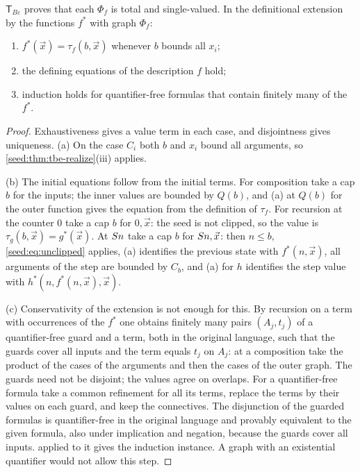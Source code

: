 \begin{lemma}[Graphs]\label{seed:lem:tbe-graph}
$\mathsf{T}_{B\varepsilon}$ proves that each $\Phi_f$ is total and
single-valued. In the definitional extension by the functions $f^*$ with
graph $\Phi_f$:
\begin{enumerate}[label=(\alph*),nosep]
\item $f^*(\vec x)=\tau_f(b,\vec x)$ whenever $b$ bounds all $x_i$;
\item the defining equations of the description $f$ hold;
\item induction holds for quantifier-free formulas that contain finitely
many of the $f^*$.
\end{enumerate}
\end{lemma}

\begin{proof}
Exhaustiveness gives a value term in each case, and disjointness gives
uniqueness. (a) On the case $C_i$ both $b$ and $x_i$ bound all arguments, so
\cref{seed:thm:tbe-realize}(iii) applies.

(b) The initial equations follow from the initial terms. For composition
take a cap $b$ for the inputs; the inner values are bounded by $Q(b)$, and
(a) at $Q(b)$ for the outer function gives the equation from the definition
of $\tau_f$. For recursion at the counter $0$ take a cap $b$ for $0,\vec x$:
the seed is not clipped, so the value is
$\tau_g(b,\vec x)=g^*(\vec x)$. At $S n$ take a cap $b$ for
$S n,\vec x$: then $n\leq b$, \eqref{seed:eq:unclipped} applies, (a)
identifies the previous state with $f^*(n,\vec x)$, all arguments of the step
are bounded by $C_b$, and (a) for $h$ identifies the step value with
$h^*(n,f^*(n,\vec x),\vec x)$.

(c) Conservativity of the extension is not enough for this. By recursion on
a term with occurrences of the $f^*$ one obtains finitely many pairs
$(A_j,t_j)$ of a quantifier-free guard and a term, both in the original
language, such that the guards cover all inputs and the term equals $t_j$ on
$A_j$: at a composition take the product of the cases of the arguments and
then the cases of the outer graph. The guards need not be disjoint; the
values agree on overlaps. For a quantifier-free formula take a common
refinement for all its terms, replace the terms by their values on each
guard, and keep the connectives. The disjunction of the guarded formulas is
quantifier-free in the original language and provably equivalent to the given
formula, also under implication and negation, because the guards cover all
inputs.  applied to it gives the induction instance. A
graph with an existential quantifier would not allow this step.
\end{proof}

